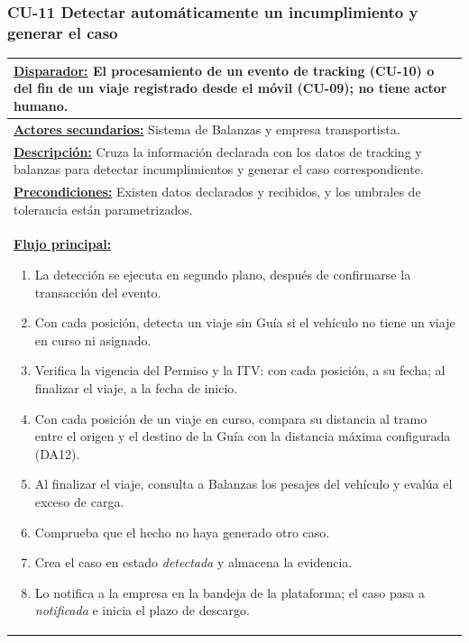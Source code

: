 \subsubsection{CU-11 Detectar automáticamente un incumplimiento y generar el caso}\label{sec:cu-11}
\begin{table}[H]
\small
\setlength{\tabcolsep}{8pt}
\renewcommand{\arraystretch}{1.1}
\centering
\begin{tabular}{|p{15.8cm}|}
\hline
\textbf{\underline{Disparador:}} El procesamiento de un evento de tracking (CU-10) o del fin de un viaje registrado desde el móvil (CU-09); no tiene actor humano. \\ \hline
\textbf{\underline{Actores secundarios:}} Sistema de Balanzas y empresa transportista. \\ \hline
\textbf{\underline{Descripción:}} Cruza la información declarada con los datos de tracking y balanzas para detectar incumplimientos y generar el caso correspondiente. \\ \hline
\textbf{\underline{Precondiciones:}} Existen datos declarados y recibidos, y los umbrales de tolerancia están parametrizados. \\ \hline
\textbf{\underline{Flujo principal:}}\par
\begin{enumerate}[leftmargin=*,topsep=2pt,itemsep=1pt,parsep=0pt,partopsep=0pt]
    \item La detección se ejecuta en segundo plano, después de confirmarse la transacción del evento.
    \item Con cada posición, detecta un viaje sin Guía si el vehículo no tiene un viaje en curso ni asignado.
    \item Verifica la vigencia del Permiso y la ITV: con cada posición, a su fecha; al finalizar el viaje, a la fecha de inicio.
    \item Con cada posición de un viaje en curso, compara su distancia al tramo entre el origen y el destino de la Guía con la distancia máxima configurada (DA12).
    \item Al finalizar el viaje, consulta a Balanzas los pesajes del vehículo y evalúa el exceso de carga.
    \item Comprueba que el hecho no haya generado otro caso.
    \item Crea el caso en estado \emph{detectada} y almacena la evidencia.
    \item Lo notifica a la empresa en la bandeja de la plataforma; el caso pasa a \emph{notificada} e inicia el plazo de descargo.

\end{enumerate}
\end{tabular}
\end{table}

